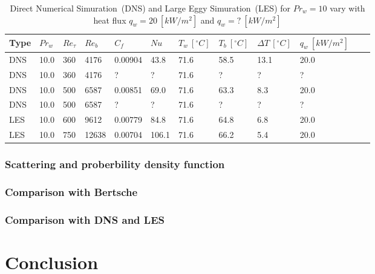\documentclass[12pt,oneside]{jbook}
\begin{document}
\begin{table}[h]
\centering
\caption{Direct Numerical Simuration\ (DNS) and Large Eggy Simuration\ (LES) for $Pr_{w} = 10$ vary with heat flux $q_{w}=20\ [kW/m^{2}]$ and $q_{w}=?\ [kW/m^{2}]$}
\vspace{1zh}
\label{simuration}
\begin{tabular}{llllllllllll} \toprule
{Type} & {$Pr_{w}$} & {$Re_{\tau}$}& {$Re_{b}$} & {$C_{f}$} & {$Nu$} & {$T_{w}\ [^\circ C]$} & {$T_{b}\ [^\circ C]$}  & {$\Delta T\ [^\circ C]$}  & {$q_{w}\ [kW/m^{2}]$} \\ \midrule
DNS & 10.0 & 360 & 4176  & 0.00904 & 43.8  & 71.6 & 58.5 & 13.1 & 20.0  \\
DNS & 10.0 & 360 & 4176  & ?       & ?     & 71.6 & ?    & ?    & ?  \\ \midrule
DNS & 10.0 & 500 & 6587  & 0.00851 & 69.0  & 71.6 & 63.3 & 8.3  & 20.0 \\
DNS & 10.0 & 500 & 6587  & ?       & ?     & 71.6 & ?    & ?    & ? \\ \midrule
LES & 10.0 & 600 & 9612  & 0.00779 & 84.8  & 71.6 & 64.8 & 6.8  & 20.0 \\ \midrule
LES & 10.0 & 750 & 12638 & 0.00704 & 106.1 & 71.6 & 66.2 & 5.4  & 20.0 \\ \bottomrule
\end{tabular}
\end{table}

\subsection{Scattering and proberbility density function}
\subsection{Comparison with Bertsche}
\subsection{Comparison with DNS and LES}
\chapter{Conclusion}


\appendix




\end{document}
